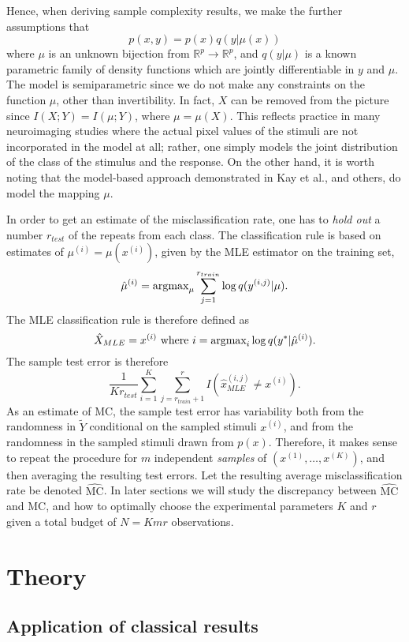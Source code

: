 \documentclass[12pt]{article}
\begin{document}
Hence, when deriving sample complexity results, we make the further assumptions
that
\[
p(x, y) = p(x) q(y|\mu(x))
\]
where $\mu$ is an unknown bijection from
$\mathbb{R}^p \to \mathbb{R}^p$, and $q(y|\mu)$ is a known parametric family of density
functions which are jointly differentiable in $y$ and $\mu$.  The
model is semiparametric since we do not make any constraints on the
function $\mu$, other than invertibility.  In fact, $X$ can be removed
from the picture since $I(X; Y)= I(\mu; Y)$, where $\mu = \mu(X)$.
This reflects practice in many neuroimaging studies where the actual
pixel values of the stimuli are not incorporated in the model at all;
rather, one simply models the joint distribution of the class of the
stimulus and the response.  On the other hand, it is worth noting
that the model-based approach demonstrated in Kay et al., and others,
do model the mapping $\mu$.

In order to get an estimate of the misclassification rate, one
has to \emph{hold out} a number $r_{test}$ of the repeats from each class.
The classification rule is based on estimates of $\mu^{(i)}
= \mu(x^{(i)})$, given by the MLE estimator on the training set,
\[
\hat{\mu}^{(i)} = \text{argmax}_\mu \sum_{j=1}^{r_{train}} \log q(y^{(i, j)}|\mu).
\]
The MLE classification rule is therefore defined as
\[
\hat{X}_{MLE} = x^{(i)} \text{ where }i = \text{argmax}_i  \log q(y^*|\hat{\mu}^{(i)}).
\]
The sample test error is therefore
\[
\frac{1}{K r_{test}} \sum_{i=1}^K \sum_{j=r_{train}+1}^r I(\hat{x}_{MLE}^{(i,j)} \neq x^{(i)}).
\] 
As an estimate of $\text{MC}$, the sample test error has variability
both from the randomness in $\tilde{Y}$ conditional on the sampled
stimuli $x^{(i)}$, and from the randomness in the sampled stimuli
drawn from $p(x)$.  Therefore, it makes sense to repeat the procedure
for $m$ independent \emph{samples} of $(x^{(1)},\hdots, x^{(K)})$, and
then averaging the resulting test errors.  Let the resulting average
misclassification rate be denoted $\hat{\text{MC}}$.  In later
sections we will study the discrepancy between $\hat{\text{MC}}$ and
$\text{MC}$, and how to optimally choose the experimental parameters
$K$ and $r$ given a total budget of $N = Kmr$ observations.



\section{Theory}

\subsection{Application of classical results}
\end{document}
